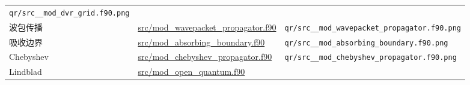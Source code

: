 \documentclass[
]{ctexbook}
\begin{document}
\begin{longtable}[]{@{}lll@{}}
\begin{minipage}[t]{0.30\columnwidth}
\texttt{qr/src\_\_mod\_dvr\_grid.f90.png}\strut
\end{minipage}\tabularnewline
\begin{minipage}[t]{0.30\columnwidth}\raggedright
波包传播\strut
\end{minipage} & \begin{minipage}[t]{0.30\columnwidth}\raggedright
\href{https://github.com/l1Ha/QuantumGeneralModule/blob/main/src/mod_wavepacket_propagator.f90}{src/mod\_wavepacket\_propagator.f90}\strut
\end{minipage} & \begin{minipage}[t]{0.30\columnwidth}\raggedright
\texttt{qr/src\_\_mod\_wavepacket\_propagator.f90.png}\strut
\end{minipage}\tabularnewline
\begin{minipage}[t]{0.30\columnwidth}\raggedright
吸收边界\strut
\end{minipage} & \begin{minipage}[t]{0.30\columnwidth}\raggedright
\href{https://github.com/l1Ha/QuantumGeneralModule/blob/main/src/mod_absorbing_boundary.f90}{src/mod\_absorbing\_boundary.f90}\strut
\end{minipage} & \begin{minipage}[t]{0.30\columnwidth}\raggedright
\texttt{qr/src\_\_mod\_absorbing\_boundary.f90.png}\strut
\end{minipage}\tabularnewline
\begin{minipage}[t]{0.30\columnwidth}\raggedright
Chebyshev\strut
\end{minipage} & \begin{minipage}[t]{0.30\columnwidth}\raggedright
\href{https://github.com/l1Ha/QuantumGeneralModule/blob/main/src/mod_chebyshev_propagator.f90}{src/mod\_chebyshev\_propagator.f90}\strut
\end{minipage} & \begin{minipage}[t]{0.30\columnwidth}\raggedright
\texttt{qr/src\_\_mod\_chebyshev\_propagator.f90.png}\strut
\end{minipage}\tabularnewline
\begin{minipage}[t]{0.30\columnwidth}\raggedright
Lindblad\strut
\end{minipage} & \begin{minipage}[t]{0.30\columnwidth}\raggedright
\href{https://github.com/l1Ha/QuantumGeneralModule/blob/main/src/mod_open_quantum.f90}{src/mod\_open\_quantum.f90}\strut
\end{minipage} & \begin{minipage}[t]{0.30\columnwidth}\raggedright

\end{minipage}
\end{longtable}
\end{document}

